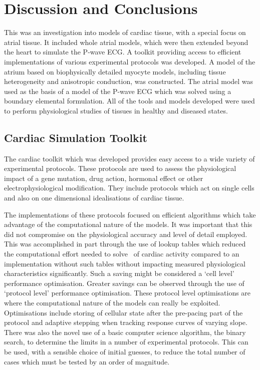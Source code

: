 \chapter{Discussion and Conclusions}


This was an investigation into models of cardiac tissue, with a special focus on
atrial tissue.
It included whole atrial models, which were then extended beyond the heart to
simulate the P-wave ECG.
A toolkit providing access to efficient implementations of various experimental
protocols was developed.
A model of the atrium based on biophysically detailed myocyte models, including tissue heterogeneity and anisotropic
conduction, was constructed.
The atrial model was used as the basis of a model of the P-wave ECG which was
solved using a boundary elemental formulation.
All of the tools and models developed were used to perform physiological
studies of tissues in healthy and diseased states.

\section{Cardiac Simulation Toolkit}

The cardiac toolkit which was developed provides easy access to a wide variety
of experimental protocols.
These protocols are used to assess the physiological impact of a gene mutation,
drug action, hormonal effect or other electrophysiological modification.
They include protocols which act on single cells and also on one dimensional
idealisations of cardiac tissue.

The implementations of these protocols focused on efficient algorithms
which take advantage of the computational nature of the models.
It was important that this did not compromise on the physiological accuracy and
level of detail employed.
This was accomplished in part through the use of lookup tables which reduced the
computational effort needed to solve \ of cardiac activity compared to an
implementation without such tables without impacting measured physiological
characteristics significantly.
Such a saving might be considered a `cell level' performance optimisation.
Greater savings can be observed through the use of `protocol level' performance
optimisation.
These protocol level optimisations are where the computational nature of the
models can really be exploited.
Optimisations include storing of cellular state after the pre-pacing part of the
protocol and adaptive stepping when tracking response curves of varying slope.
There was also the novel use of a basic computer science algorithm, the binary
search, to determine the limits in a number of experimental protocols.
This can be used, with a sensible choice of initial guesses, to reduce the total
number of cases which must be tested by an order of magnitude.

